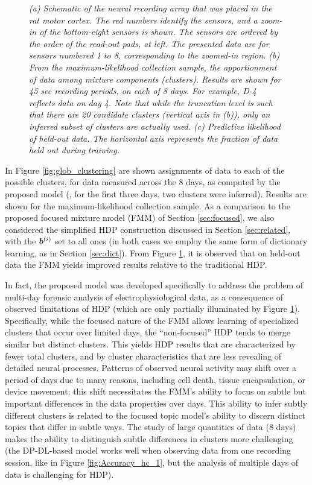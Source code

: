 \documentclass[journal]{IEEEtran}
\begin{document}
\begin{figure}[!htbp]
{   \label{fig:likelihood}
 }
  \caption{\small \emph{(a) Schematic of the neural
recording array that was placed in the rat motor cortex. The red
numbers identify the sensors, and a zoom-in of the bottom-eight
sensors is shown. The sensors are ordered by the order of the
read-out pads, at left. The presented data are for sensors numbered 1 to 8, corresponding to the zoomed-in region. (b) From the maximum-likelihood collection
sample, the apportionment of data among mixture components
(clusters). Results are shown for 45 sec recording periods, on each
of 8 days. For example, D-4 reflects data on day 4. Note that while the truncation level is such that there are 20 candidate clusters (vertical axis in (b)), only an inferred subset of clusters are actually used. (c) Predictive likelihood of held-out data. The
horizontal axis represents the fraction of data held out during training.}}
\end{figure}

In Figure \ref{fig:glob_clustering} are shown assignments of data to each of the possible clusters, for data measured across the 8 days, as computed by the proposed model (, for the first three days, two clusters were inferred). Results are shown for the maximum-likelihood collection sample. As a comparison to the proposed focused mixture model (FMM) of Section \ref{sec:focused}, we also considered the simplified HDP construction discussed in Section \ref{sec:related}, with the $\boldsymbol{b}^{(i)}$ set to all ones (in both cases we employ the same form of dictionary learning, as in Section \ref{sec:dict}). From Figure \ref{fig:likelihood}, it is observed that on held-out data the FMM yields improved results relative to the traditional HDP.

In fact, the proposed model was developed specifically to address the problem of multi-day forensic analysis of electrophysiological data, as a consequence of observed limitations of HDP (which are only partially illuminated by Figure \ref{fig:likelihood}). Specifically, while the focused nature of the FMM allows learning of specialized clusters that occur over limited days, the ``non-focused'' HDP tends to merge similar but distinct clusters. This yields HDP results that are characterized by fewer total clusters, and by cluster characteristics that are less revealing of detailed neural processes. Patterns of observed neural activity may shift over a period of days due to many reasons, including cell death, tissue encapsulation, or device movement; this shift necessitates the FMM's ability to focus on subtle but important differences in the data properties over days. This ability to infer subtly different clusters is related to the focused topic model's ability  \cite{compound} to discern distinct topics that differ in subtle ways. The study of large quantities of data (8 days) makes the ability to distinguish subtle differences in clusters more challenging (the DP-DL-based model works well when observing data from one recording session, like in Figure \ref{fig:Accuracy_hc_1}, but the analysis of multiple days of data is challenging for HDP).
\end{document}
